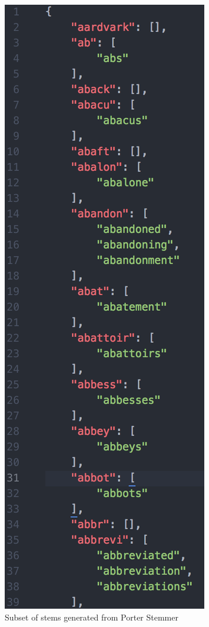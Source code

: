 \documentclass[letterpaper,11pt]{article}
\begin{document}
\begin{figure}[h]
\centering
\includegraphics[scale=0.6]{stems.png}
\caption{Subset of stems generated from Porter Stemmer}
\label{fig:stemspic}
\end{figure}
\end{document}
